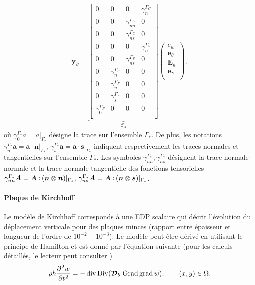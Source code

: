 \begin{equation*}
\begin{aligned}
\bm{y}_\partial = \underbrace{
	\begin{bmatrix}
	{0} & {0} & {0} & \gamma_{n}^{\Gamma_C} \\
	{0} & {0} & \gamma_{nn}^{\Gamma_C} & {0} \\
	{0} & {0} & \gamma_{ns}^{\Gamma_C} & {0} \\
	{0} & {0} & {0} & \gamma_{n}^{\Gamma_S} \\
	{0} & {0} & \gamma_{ns}^{\Gamma_S} & {0} \\
	{0} & \gamma_{n}^{\Gamma_S} & {0} & {0} \\
	{0} & \gamma_{n}^{\Gamma_F} & {0} & {0} \\
	{0} & \gamma_{s}^{\Gamma_F} & {0} & {0} \\
	\gamma_{0}^{\Gamma_F} & {0} & {0} & {0} \\
	\end{bmatrix}}_{\mathcal{C}_\partial}
\begin{pmatrix}
e_w \\
\bm{e}_{\theta} \\
\bm{E}_{\kappa} \\
\bm{e}_{\gamma} \\
\end{pmatrix},
\end{aligned}
\end{equation*}
où $\gamma_{0}^{\Gamma_*} a = a \vert_{\Gamma_*} $ désigne la trace sur l'ensemble $\Gamma_*$. De plus, les notations $\gamma_{n}^{\Gamma_*} \bm{a} = \bm{a} \cdot \bm{n} \vert_{\Gamma_*}, \, \gamma_{s}^{\Gamma_*} \bm{a} = \bm{a} \cdot \bm{s} \vert_{\Gamma_*} $ indiquent respectivement les traces normales et tangentielles sur l'ensemble $\Gamma_* $. Les symboles $\gamma_{nn}^{\Gamma_*}, \gamma_{ns}^{\Gamma_*} $ désignent la trace normale-normale et la trace normale-tangentielle des fonctions tensorielles $\gamma_{nn}^{\Gamma_*} \bm{A} = \bm{A} \cddot (\bm{n} \otimes \bm{n}) \vert_{\Gamma_*}, \, \gamma_{ns}^{\Gamma_*} \bm{A} = \bm{A} \cddot (\bm{n} \otimes \bm{s}) \vert_{\Gamma_*} $. 

\paragraph{Plaque de Kirchhoff}
Le modèle de Kirchhoff corresponds à une EDP scalaire qui décrit l'évolution du déplacement verticale pour des plaques minces (rapport entre épaisseur et longueur de l'ordre de $10^{-2}-10^{-3}$). Le modèle peut être dérivé en utilisant le principe de Hamilton et est donné par l'équation suivante (pour les calculs détaillés, le lecteur peut consulter \cite[Chapter 3]{reddy2006theory})
\begin{equation*}
\rho h \diffp[2]{w}{t} = - \div\Div (\bm{\mathcal{D}}_b\, \Grad\grad{w}), \qquad (x,y) \in \Omega.
\end{equation*}

